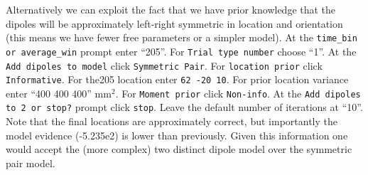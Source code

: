 Alternatively we can exploit the fact that we have prior knowledge that the dipoles will be approximately left-right symmetric in location and orientation (this means we have fewer free parameters or a simpler model). At the \texttt{time\_bin or average\_win} prompt enter ``205''.  For \texttt{Trial type number} choose ``1''. At the \texttt{Add dipoles to model} click \texttt{Symmetric Pair}. For \texttt{location prior} click \texttt{Informative}. For the205 location enter \texttt{62 -20 10}. For prior location variance enter ``400 400 400'' mm$^2$. For \texttt{Moment prior} click \texttt{Non-info}. At the \texttt{Add dipoles to 2 or stop?} prompt click \texttt{stop}.  Leave the default number of iterations at ``10''. Note that the final locations are approximately correct, but importantly the model evidence (-5.235e2) is lower than previously. Given this information one would accept the (more complex) two distinct dipole model over the symmetric pair model.


